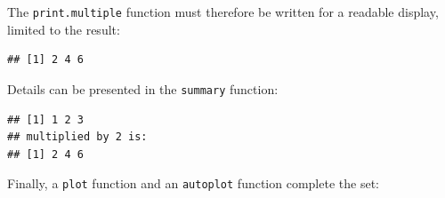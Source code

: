 \documentclass[
  12pt,
  american,
  a4paper,
  extrafontsizes,onecolumn,openright
  ]{memoir}
\newenvironment{Shaded}{\begin{snugshade}}{\end{snugshade}}
\newcommand{\CommentTok}[1]{\textcolor[rgb]{0.56,0.35,0.01}{\textit{#1}}}
\newcommand{\ControlFlowTok}[1]{\textcolor[rgb]{0.13,0.29,0.53}{\textbf{#1}}}
\newcommand{\FunctionTok}[1]{\textcolor[rgb]{0.00,0.00,0.00}{#1}}
\newcommand{\NormalTok}[1]{#1}
\newcommand{\OtherTok}[1]{\textcolor[rgb]{0.56,0.35,0.01}{#1}}
\newcommand{\SpecialCharTok}[1]{\textcolor[rgb]{0.00,0.00,0.00}{#1}}
\newcommand{\StringTok}[1]{\textcolor[rgb]{0.31,0.60,0.02}{#1}}
\begin{document}
\normalsize

The \texttt{print.multiple} function must therefore be written for a readable display, limited to the result:

\scriptsize

\begin{Shaded}
\end{Shaded}

\begin{verbatim}
## [1] 2 4 6
\end{verbatim}

\normalsize

Details can be presented in the \texttt{summary} function:

\scriptsize

\begin{Shaded}
\end{Shaded}

\begin{verbatim}
## [1] 1 2 3
## multiplied by 2 is:
## [1] 2 4 6
\end{verbatim}

\normalsize

Finally, a \texttt{plot} function and an \texttt{autoplot} function complete the set:

\scriptsize
\end{document}
